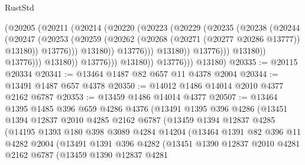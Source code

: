 \begin{lexlean}{RustStd}
\begin{coremodule}
                                      (@20205
                                        (@20211
                                          (@20214
                                            (@20220
                                              (@20223
                                                (@20229
                                                  (@20235
                                                    (@20238
                                                      (@20244
                                                        (@20247
                                                          (@20253
                                                            (@20259
                                                              (@20262
                                                                (@20268
                                                                  (@20271 (@20277 @20286 @13777))
                                                                  @13180))
                                                              @13776)))
                                                        @13180))
                                                    @13776)))
                                              @13180))
                                          @13776)))
                                    @13180))
                                @13776)))
                          @13180))
                      @13776)))
                @13180))
            @13776)))
      @13180)
@20335 := @20115 @20334
@20341 := @13464 @1487 @82 @657 @11 @4378 @2004
@20344 := @13491 @1487 @657 @4378
@20350 := @14012 @1486 @14014 @2010 @4377 @2162 @6787
@20353 := @13459 @1486 @14014 @4377
@20507 := @13464
    @1395
    @1485
    @396
    @659
    @4286
    @4376
    (@13491
      @1395
      @396
      @4286
      (@13451
        @1394
        @12837
        @2010
        @4285
        @2162
        @6787
        (@13459
          @1394
          @12837
          @4285
          (@14195
            @1393
            @180
            @398
            @3089
            @4284
            @14204
            (@13464
              @1391
              @82
              @396
              @11
              @4282
              @2004
              (@13491
                @1391
                @396
                @4282
                (@13451
                  @1390
                  @12837
                  @2010
                  @4281
                  @2162
                  @6787
                  (@13459
                    @1390
                    @12837
                    @4281

\end{coremodule}
\end{lexlean}
